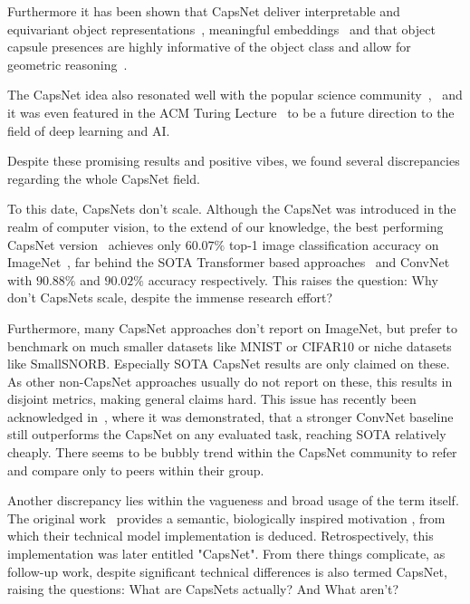 \documentclass{article}
\begin{document}
Furthermore it has been shown that CapsNet deliver interpretable and equivariant object representations~\cite{nips/LenssenFL18}, meaningful embeddings~\cite{corr/Lin2018} and that object capsule presences are highly informative of the object class and allow for geometric reasoning~\cite{nips/KosiorekSTH19}.

The CapsNet idea also resonated well with the popular science community~\cite{book/hawkins2021},~\cite{book/Hiesinger2021} and it was even featured in the ACM Turing Lecture~\cite{comacm/Bengio2021} to be a future direction to the field of deep learning and AI.

Despite these promising results and positive vibes, we found several discrepancies regarding the whole CapsNet field.

To this date, CapsNets don't scale. Although the CapsNet was introduced in the realm of computer vision, to the extend of our knowledge, the best performing CapsNet version~\cite{nips/AhmedT19} achieves only $60.07\%$ top-1 image classification accuracy on ImageNet~\cite{data/imagenet}, far behind the SOTA Transformer based approaches~\cite{corr/Wortsman2022} and  ConvNet~\cite{cvpr/Pham2021} with $90.88\%$ and  $90.02\%$ accuracy respectively.
This raises the question: Why don't CapsNets scale, despite the immense research effort?

Furthermore, many CapsNet approaches don't report on ImageNet, but prefer to benchmark on much smaller datasets like MNIST or CIFAR10 or niche datasets like SmallSNORB. %
Especially SOTA CapsNet results are only claimed on these. %
As other non-CapsNet approaches usually do not report on these, this results in disjoint metrics, making general claims hard.
This issue has recently been acknowledged in~\cite{cvpr/GuT021}, where it was demonstrated, that a stronger ConvNet baseline still outperforms the CapsNet on any evaluated task, reaching SOTA relatively cheaply.
There seems to be bubbly trend within the CapsNet community to refer and compare only to peers within their group.

Another discrepancy lies within the vagueness and broad usage of the term itself.
The original work~\cite{nips/SabourFH17} provides a semantic, biologically inspired motivation , from which their technical model implementation is deduced. Retrospectively, this implementation was later entitled "CapsNet".
From there things complicate, as follow-up work, despite significant technical differences is also termed CapsNet, raising the questions: What are CapsNets actually? And What aren't?
\end{document}
